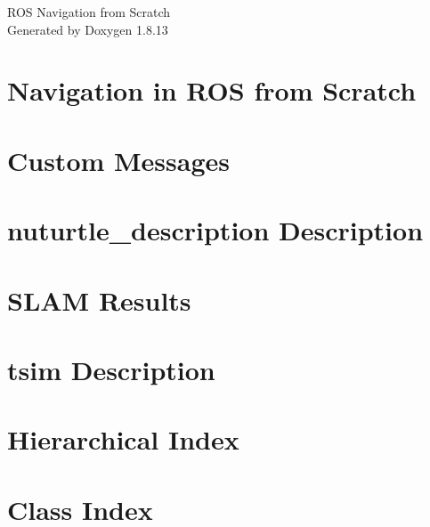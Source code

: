 \documentclass[twoside]{book}
\newcommand{\+}{\discretionary{\mbox{\scriptsize$\hookleftarrow$}}{}{}}
\newcommand{\clearemptydoublepage}{%
  \newpage{\pagestyle{empty}\cleardoublepage}%
}
\begin{document}
\hypersetup{pageanchor=false,
             bookmarksnumbered=true,
             pdfencoding=unicode
            }
\begin{titlepage}
\vspace*{7cm}
\begin{center}%
{\Large R\+OS Navigation from Scratch }\\
\vspace*{1cm}
{\large Generated by Doxygen 1.8.13}\\
\end{center}
\end{titlepage}
\clearemptydoublepage
{}
\tableofcontents
\clearemptydoublepage
{}
\hypersetup{pageanchor=true}

\chapter{Navigation in R\+OS from Scratch}
\label{index}\hypertarget{index}{}
\chapter{Custom Messages}
\label{md_MSG_SRV_TYPES}

\chapter{nuturtle\+\_\+description Description}
\label{md_nuturtle_description_README}

\chapter{S\+L\+AM Results}
\label{md_SLAM_RESULTS}

\chapter{tsim Description}
\label{md_tsim_README}

\chapter{Hierarchical Index}

\chapter{Class Index}

\end{document}
